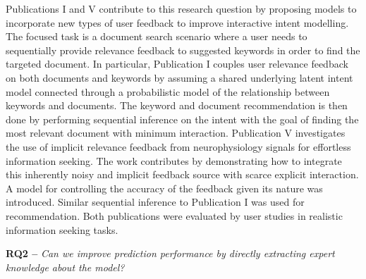 \documentclass[dissertation,math,vertlayout,pdfa,colorlinks]{aaltoseries}
\begin{document}
Publications I and V contribute to this research question by proposing models to incorporate new types of user feedback to improve interactive intent modelling. The focused task is a document search scenario where a user needs to sequentially provide relevance feedback to suggested keywords in order to find the targeted document. %
In particular, Publication I couples user relevance feedback on both documents and keywords by assuming a shared underlying latent intent model connected through a probabilistic model of the relationship between keywords and documents. The keyword and document recommendation is then done by performing sequential inference on the intent with the goal of finding the most relevant document with minimum interaction.
Publication V investigates the use of implicit relevance feedback from neurophysiology signals for effortless information seeking. The work contributes by demonstrating how to integrate this inherently noisy and implicit feedback source with scarce explicit interaction. A model for controlling the accuracy of the feedback given its nature %
was introduced. 
Similar sequential inference to Publication I was used for recommendation. 
Both publications were evaluated by user studies in realistic information seeking tasks. 


\noindent \textbf{RQ2 --} \textit{Can we improve prediction performance by directly extracting expert knowledge about the model?}
\end{document}
